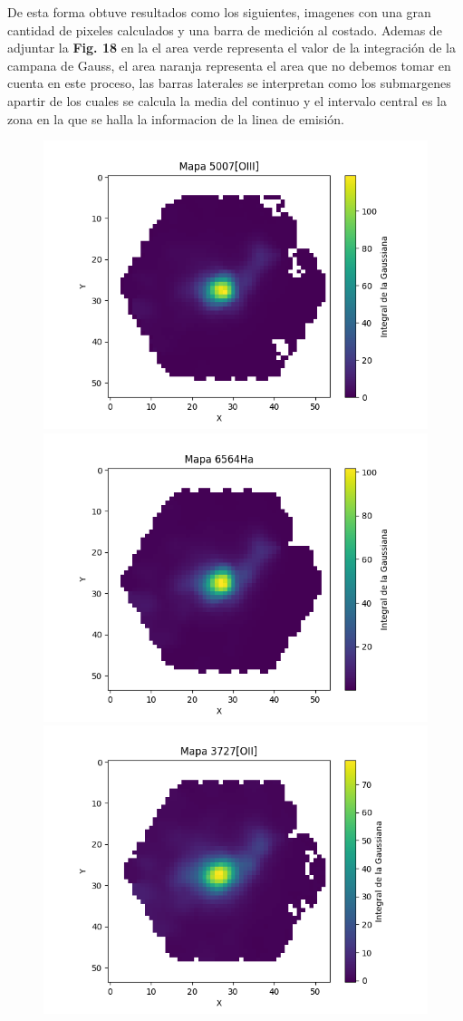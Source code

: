\documentclass[9pt,twocolumn,a4paper]{opticajnl}
\begin{document}
De esta forma obtuve resultados como los siguientes, imagenes con una gran cantidad de pixeles calculados y una barra de medición al costado. Ademas de adjuntar la \textbf{Fig. 18 } en la el area verde representa el valor de la integración de la campana de Gauss, el area naranja representa el area que no debemos tomar en cuenta en este proceso, las barras laterales se interpretan como los submargenes apartir de los cuales se calcula la media del continuo y el intervalo central es la zona en la que se halla la informacion de la linea de emisión.

\begin{figure}
    \centering
    \includegraphics[width=0.8\linewidth]{../Codigos/extractorLineasEmision/imgs/imgs7495-6102_lines/img7495-6102_[OIII]_5007_.png}
    \includegraphics[width=0.8\linewidth]{../Codigos/extractorLineasEmision/imgs/imgs7495-6102_lines/img7495-6102_Ha_6564_.png}
    \includegraphics[width=0.8\linewidth]{../Codigos/extractorLineasEmision/imgs/imgs7495-6102_lines/img7495-6102_[OII]_3727_.png}

\end{figure}
\end{document}
